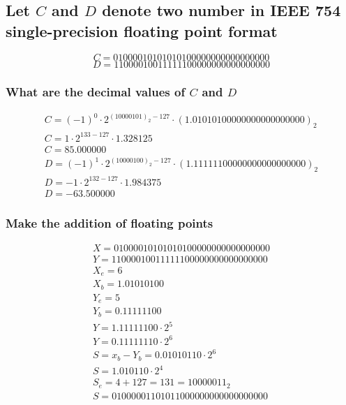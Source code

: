 \documentclass[12pt, a4paper]{article}
\begin{document}
		\subsection{Let $C$ and $D$ denote two number in IEEE 754 single-precision floating point format}
			$$C=0 1000 0101 0101 0100 000000000000000$$
			$$D=1 1000 0100 1111 1100 000000000000000$$
			\subsubsection{What are the decimal values of $C$ and $D$}
				\begin{align*}  
				C=(-1)^0\cdot 2^{(1000 0101)_2-127}\cdot (1.0101 0100 000000000000000)_2\\
				C=1\cdot 2^{133-127}\cdot 1.328125\\
				C= 85.000000\\[4mm]
				D=(-1)^1\cdot 2^{(1000 0100)_2-127}\cdot (1.1111 1100 000000000000000)_2\\
				D=-1\cdot 2^{132-127}\cdot 1.984375\\
				D=-63.500000
				\end{align*}
			\subsubsection{Make the addition of floating points}
				\begin{align*}
					X=0 1000 0101 0101 0100 0000 0000 0000 000\\
					Y=1 1000 0100 1111 1100 0000 0000 0000 000\\
					X_e=6\\
					X_b=1.0101 0100\\
					Y_e=5\\
					Y_b=0.1111 1100\\
					Y=1.1111 1100 \cdot 2^5\\
					Y=0.1111 1110 \cdot 2^6\\
					S = x_b-Y_b=0.0101 0110\cdot 2^6\\
					S = 1.01 0110\cdot 2^4\\
					S_e=4+127=131=1000 0011_2\\
					S=0 1000 0011 0101 1000 0000 0000 0000 000
				\end{align*}
\end{document}
